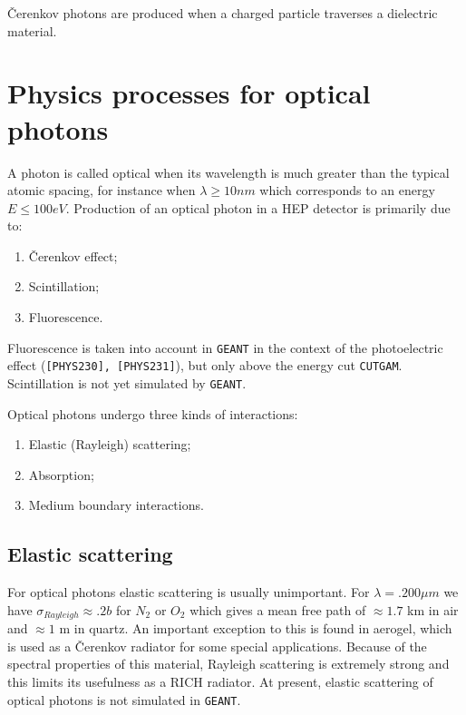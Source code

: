 \v{C}erenkov photons are produced when a charged particle traverses
a dielectric material.

\section{Physics processes for optical photons}
A photon is called optical when its wavelength is much greater than the
typical atomic spacing, for instance when $\lambda \geq 10nm $
which corresponds to an energy $E \leq 100eV$.
Production of an optical photon in a HEP detector is primarily due to:
\begin{enumerate}
\item \v{C}erenkov effect;
\item Scintillation;
\item Fluorescence.
\end{enumerate}

Fluorescence is taken into account in {\tt GEANT} in the context of the
photoelectric effect ({\tt [PHYS230], [PHYS231]}), but only above the energy cut
{\tt CUTGAM}. Scintillation is not yet simulated by {\tt GEANT}.

Optical photons undergo three kinds of interactions:
\begin{enumerate}
\item Elastic (Rayleigh) scattering;
\item Absorption;
\item Medium boundary interactions.
\end{enumerate}

\subsection{Elastic scattering}
For optical photons elastic scattering is usually unimportant. For
$\lambda=.200\mu m$ we have $\sigma_{Rayleigh} \approx .2b$ for $N_{2}$ 
or $O_{2}$ which gives a mean free path of $\approx 1.7$ km in air
and $\approx 1$ m in quartz. 
An important exception to this is found in aerogel, which is used as a 
\v{C}erenkov radiator for some special applications. Because of the 
spectral properties of this material, Rayleigh scattering is extremely
strong and this limits its usefulness as a RICH radiator. At present,
elastic scattering of optical photons is not simulated in {\tt GEANT}.

